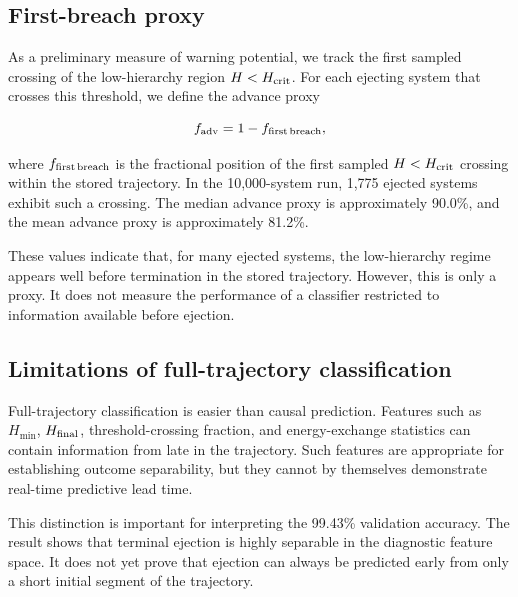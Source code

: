\documentclass[12pt,a4paper]{article}
\newcommand{\Hcrit}{H_{\rm crit}}
\newcommand{\Hmin}{H_{\min}}
\begin{document}
\subsection{First-breach proxy}
\label{sec:first_breach_proxy}

As a preliminary measure of warning potential, we track the first sampled crossing of the low-hierarchy region \(H<\Hcrit\). For each ejecting system that crosses this threshold, we define the advance proxy

\begin{equation}
    f_{\rm adv}
    =
    1 -
    f_{\rm first\,breach},
    \label{eq:advance_proxy}
\end{equation}

where \(f_{\rm first\,breach}\) is the fractional position of the first sampled \(H<\Hcrit\) crossing within the stored trajectory. In the 10,000-system run, 1,775 ejected systems exhibit such a crossing. The median advance proxy is approximately 90.0\%, and the mean advance proxy is approximately 81.2\%.

These values indicate that, for many ejected systems, the low-hierarchy regime appears well before termination in the stored trajectory. However, this is only a proxy. It does not measure the performance of a classifier restricted to information available before ejection.

\subsection{Limitations of full-trajectory classification}
\label{sec:full_trajectory_limitation}

Full-trajectory classification is easier than causal prediction. Features such as \(\Hmin\), \(H_{\rm final}\), threshold-crossing fraction, and energy-exchange statistics can contain information from late in the trajectory. Such features are appropriate for establishing outcome separability, but they cannot by themselves demonstrate real-time predictive lead time.

This distinction is important for interpreting the 99.43\% validation accuracy. The result shows that terminal ejection is highly separable in the diagnostic feature space. It does not yet prove that ejection can always be predicted early from only a short initial segment of the trajectory.
\end{document}
